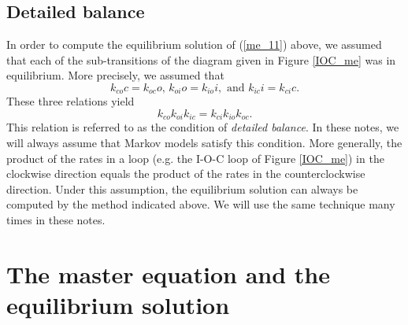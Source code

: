 \subsection{Detailed balance}

In order to compute the equilibrium solution of (\ref{me_11}) above, we assumed that each of the sub-transitions of the diagram given in Figure \ref{IOC_me} was in equilibrium. More precisely, we assumed that
\[k_{co}c    =k_{oc}o, \, k_{oi}o =k_{io}i,  \text{ and }k_{ic}i =k_{ci}c. \]
These three relations yield
\begin{equation}
k_{co}k_{oi}k_{ic}=k_{ci}k_{io}k_{oc}. \label {db}
\end{equation}
This relation is referred to as the condition of {\it detailed balance}. In these notes, we will always assume that Markov models satisfy this condition. More generally, the product of the rates in a loop (e.g. the I-O-C loop of Figure \ref{IOC_me}) in the clockwise direction equals the product of the rates in the counterclockwise direction. Under this assumption, the equilibrium solution can always be computed by the method indicated above. We will use the same technique many times in these notes.



\section{The master equation and the equilibrium solution}
\label{me_eq}

